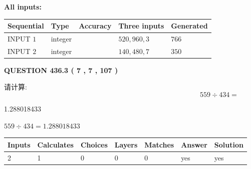 \documentclass{ctexart}
\begin{document}
   
   
   
\noindent\vspace{0.1in}\hspace{-0.08in} {\textbf{\Large{All inputs: }}}
   
   
  
  
\noindent\begin{tabular}{|l|l|l|l|l|}
\hline
 Sequential & Type & Accuracy & Three inputs & Generated \\ 
\hline
 
 
  INPUT $  1 $ & integer &  & $
 520
 , 
 960
 , 
 3
 $ & $ 766 $ 
 \\  \hline  
 
 
  INPUT $  2 $ & integer &  & $
 140
 , 
 480
 , 
 7
 $ & $ 350 $ 
 \\  \hline  
 \end{tabular}
   
   
  
\vspace{0.2in}
  
{\textbf{\Large{QUESTION
436.3 
 ( 7 , 7 , 107 )
}}}
  
  
 
请计算:
\begin{equation}
559  \div    %
434 = \nonumber
\end{equation}
 
 
 
\noindent{}
 
 

1.288018433
 
 
\noindent{}
 
 

 
 
 
\noindent{}
 
 

$ %
559 \div  %
434=   %
1.288018433$
 
 
\noindent{}
 
 

 
   
   
   
   
\noindent\begin{tabular}{|l|l|l|l|l|l|l|}
 \hline
Inputs & Calculates & Choices & Layers & Matches & Answer & Solution \\ \hline
 2  & 
 1  & 
 0
  & 
 0  & 
 0  & 
  yes & 
  yes 
  \\ \hline
 \end{tabular}
   
\end{document}
